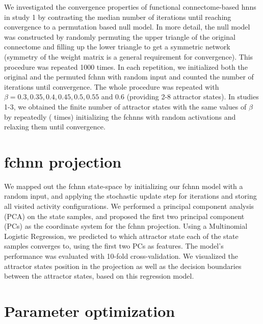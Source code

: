 \documentclass{article}
\begin{document}
We investigated the convergence properties of functional connectome-based \acrshort{hnn}s in study 1 by contrasting the median number of iterations until reaching convergence to a permutation based null model. In more detail, the null model was constructed by randomly permuting the upper triangle of the original connectome and filling up the lower triangle to get a symmetric network (symmetry of the weight matrix is a general requirement for convergence). This procedure was repeated 1000 times. In each repetition, we initialized both the original and the permuted \acrshort{fchnn} with random input and counted the number of iterations until convergence. The whole procedure was repeated with $\beta=0.3, 0.35, 0.4, 0.45, 0.5, 0.55$ and 0.6 (providing 2-8 attractor states).
In studies 1-3, we obtained the finite number of attractor states with the same values of $\beta$ by repeate\acrshort{dl}y ( times) initializing the \acrshort{fchnn}s with random activations and relaxing them until convergence.

\section{\acrshort{fchnn} projection}

We mapped out the \acrshort{fchnn} state-space by initializing our \acrshort{fchnn} model with a random input, and applying the stochastic update step for  iterations and storing all visited activity configurations.
We performed a principal component analysis (PCA) on the state samples, and proposed the first two principal component (PCs) as the coordinate system for the \acrshort{fchnn} projection. Using a Multinomial Logistic Regression, we predicted to which attractor state each of the state samples converges to, using the first two PCs as features. The model's performance was evaluated with 10-fold cross-validation. We visualized the attractor states position in the projection as well as the decision boundaries between the attractor states, based on this regression model.

\section{Parameter optimization}
\end{document}
